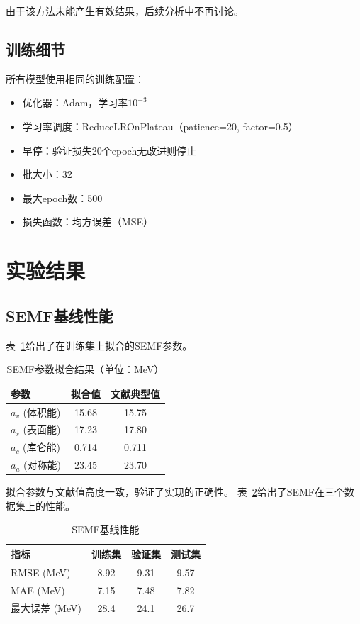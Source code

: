 \documentclass[12pt, a4paper]{article}
\begin{document}
由于该方法未能产生有效结果，后续分析中不再讨论。

\subsection{训练细节}

所有模型使用相同的训练配置：
\begin{itemize}
  \item 优化器：Adam，学习率$10^{-3}$
  \item 学习率调度：ReduceLROnPlateau（patience=20, factor=0.5）
  \item 早停：验证损失20个epoch无改进则停止
  \item 批大小：32
  \item 最大epoch数：500
  \item 损失函数：均方误差（MSE）
\end{itemize}

\section{实验结果}
\label{sec:results}

\subsection{SEMF基线性能}

表~\ref{tab:semf_params}给出了在训练集上拟合的SEMF参数。

\begin{table}[htbp]
  \centering
  \caption{SEMF参数拟合结果（单位：MeV）}
  \label{tab:semf_params}
  \begin{tabular}{lcc}
    \toprule
    \textbf{参数} & \textbf{拟合值} & \textbf{文献典型值} \\
    \midrule
    $a_v$ (体积能) & 15.68 & 15.75 \\
    $a_s$ (表面能) & 17.23 & 17.80 \\
    $a_c$ (库仑能) & 0.714 & 0.711 \\
    $a_a$ (对称能) & 23.45 & 23.70 \\
    \bottomrule
  \end{tabular}
\end{table}

拟合参数与文献值高度一致，验证了实现的正确性。
表~\ref{tab:semf_results}给出了SEMF在三个数据集上的性能。

\begin{table}[htbp]
  \centering
  \caption{SEMF基线性能}
  \label{tab:semf_results}
  \begin{tabular}{lccc}
    \toprule
    \textbf{指标} & \textbf{训练集} & \textbf{验证集} & \textbf{测试集} \\
    \midrule
    RMSE (MeV) & 8.92 & 9.31 & 9.57 \\
    MAE (MeV) & 7.15 & 7.48 & 7.82 \\
    最大误差 (MeV) & 28.4 & 24.1 & 26.7 \\
    \bottomrule
  \end{tabular}
\end{table}
\end{document}
